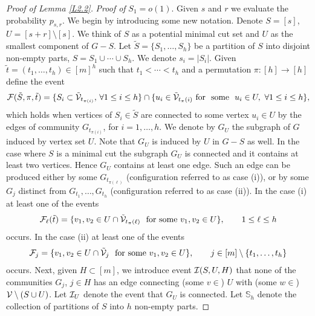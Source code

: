 \documentclass[11pt, a4paper]{article}
\begin{document}
\begin{proof}[Proof of Lemma \ref{L2.2}]
{\it Proof of} $S_1=o(1)$.
Given $s$ and $r$ we evaluate the probability $p_{s,r}$.
We begin by introducing some new notation.
Denote $S=[s]$, $U=[s+r]\setminus[s]$. 
We think of $S$ as a potential minimal cut set  and $U$ as the smallest component of $G-S$.
Let ${\tilde S}=\{S_1,\dots, S_h\}$ be a partition of $S$ into disjoint non-empty parts, $S=S_1\cup\cdots\cup S_h$. We denote $s_i=|S_i|$. 
Given ${\tilde t}=(t_1,\dots, t_h)\in [m]^h$
such
that $t_1<\cdots<t_h$ and a permutation $\pi:[h]\to[h]$
define the event 
\begin{align*}
{\cal F}({\tilde S}, \pi, {\tilde t})
=\{S_{i}\subset {\tilde {\cal V}}_{t_{\pi(i)}},  \,\forall  1\le i\le h\}\cap
\{ u_i\in {\tilde {\cal V}}_{t_\pi(i)} {\text{\ for \ some \ }} u_i\in U,\  \forall  1\le i\le h\},
\end{align*}
which holds when vertices of $S_i\in{\tilde S}$
 are connected to some vertex $u_i \in U$ by the edges of community 
 $G_{t_{\pi(i)}}$, for $i=1,\dots, h$. 
We denote by  $G_U$ the subgraph of $G$ induced by vertex set $U$. Note that $G_U$  is induced by $U$ in $G-S$ as well. In the case where $S$ is a minimal cut the subgraph 
$G_U$ is connected and it contains at least two vertices. Hence $G_U$ contains at least one edge. 
Such an edge can be produced either by  some 
$G_{t_{\pi(\ell)}}$ (configuration referred to as  case (i)),  or  by some $G_j$ distinct from $G_{t_1},\dots, G_{t_h}$ (configuration referred to as  case (ii)).
In the case (i) at least one of the events
 \begin{align}
 \label{2025-08-12+r}
 {\cal F}_{\ell}({\tilde t})
 =\{v_1,v_2\in U\cap {\tilde {\cal V}}_{t_\pi(\ell)} {\text{ \ for\ some\ }}v_1,v_2\in U \},
 \qquad 
  1\le \ell\le h
\end{align}
occurs. In the case (ii) at least one of the events
 \begin{align*}
 {\cal F}_j
 =
\{v_1,v_2\in U\cap {\tilde {\cal V}}_{j} {\text{ \ for\ some\ }}v_1,v_2\in U\},
\qquad
 j\in [m]\setminus \{t_1,\dots, t_h\}
\end{align*}
occurs.
%
Next, given  $H\subset [m]$, we introduce event ${\cal I}(S,U, H)$
 that 
none of the communities $G_j$, $j\in H$ has an edge connecting (some 
$v\in$) $U$ with (some $w\in$) ${\cal V}\setminus (S\cup U)$.
Let ${\cal I}_U$ denote the event that  $G_U$  is connected.
Let ${\mathbb S}_h$ denote the collection of partitions of $S$ into $h$ non-empty parts. 


\end{proof}
\end{document}
